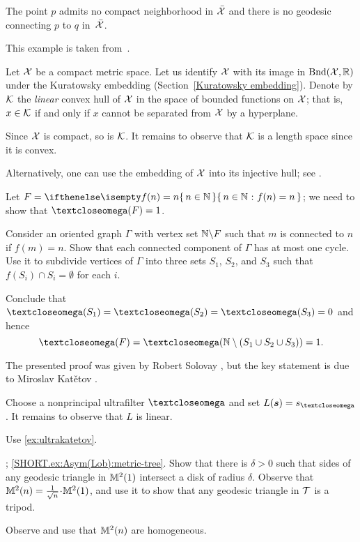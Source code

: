 The point $p$ admits no compact neighborhood in $\bar{\mathcal{X}}$ 
and there is no geodesic connecting $p$ to $q$ in~$\bar{\mathcal{X}}$.

 This example is taken from~\cite{bridson-haefliger}.

Let $\mathcal{X}$ be a compact metric space.
Let us identify $\mathcal{X}$ with its image in $\mathrm{Bnd}(\mathcal{X},\mathbb{R})$ under the Kuratowsky embedding (Section~\ref{Kuratowsky embedding}). 
Denote by $\mathcal{K}$ the \textit{linear} convex hull of $\mathcal{X}$ in the space of bounded functions on $\mathcal{X}$; 
that is, $x\in \spc{K}$ if and only if $x$ cannot be separated from $\mathcal{X}$ by a hyperplane.

Since $\mathcal{X}$ is compact, so is $\mathcal{K}$.
It remains to observe that $\mathcal{K}$ is a length space since it is convex.

Alternatively, one can use the embedding of $\mathcal{X}$ into its injective hull; see \cite{isbell}.

Let $F=\set{n\in \NN}{f(n)=n}$; we need to show that $\o(F)=1$.

Consider an oriented graph $\Gamma$ with vertex set $\mathbb{N}\backslash F$ such that $m$ is connected to $n$ if $f(m)=n$.
Show that each connected component of $\Gamma$ has at most one cycle.
Use it to subdivide vertices of $\Gamma$ into three sets $S_1$, $S_2$, and $S_3$ such that $f(S_i)\cap S_i=\emptyset$ for each $i$.

Conclude that $\o(S_1)=\o(S_2)=\o(S_3)=0$ and hence \[\o(F)=\o(\NN\setminus(S_1\cup S_2\cup S_3))=1.\]

The presented proof was given by Robert Solovay \cite{solovay}, but
the key statement is due to Miroslav Katětov \cite{katetov}.

Choose a nonprincipal ultrafilter $\o$ and set $L(\bm{s})=s_\o$.
It remains to observe that $L$ is linear.

Use \ref{ex:ultrakatetov}.

\parbf{\ref{ex:Asym(Lob)}}; \ref{SHORT.ex:Asym(Lob):metric-tree}.
Show that there is $\delta>0$ such that sides of any geodesic triangle in $\mathbb{M}_{{}}^{2}({1})$ intersect a disk of radius $\delta$.
Observe that $\Lob2n\z=\tfrac1{\sqrt{n}}\cdot\Lob21$, and use it to show that any geodesic triangle in $\mathcal{T}$ is a tripod.

 Observe and use that $\mathbb{M}_{{}}^{2}({n})$ are homogeneous.

